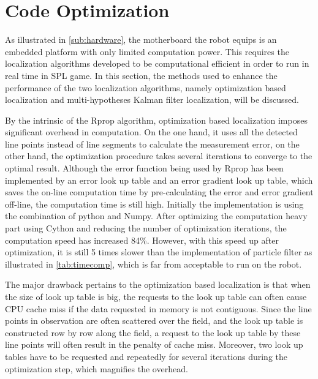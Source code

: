 




\section{Code Optimization}
\label{sec:Optimization}
As illustrated in \autoref{sub:hardware}, the motherboard the robot equips is an embedded platform with only limited computation power. This requires the localization algorithms developed to be computational efficient in order to run in real time in \gls{SPL} game. In this section, the methods used to enhance the performance of the two localization algorithms, namely optimization based localization and multi-hypotheses Kalman filter localization, will be discussed.

By the intrinsic of the Rprop algorithm, optimization based localization imposes significant overhead in computation. On the one hand, it uses all the detected line points instead of line segments to calculate the measurement error, on the other hand, the optimization procedure takes several iterations to converge to the optimal result. Although the error function being used by Rprop has been implemented by an error look up table and an error gradient look up table, which saves the on-line computation time by pre-calculating the error and error gradient off-line, the computation time is still high. Initially the implementation is using the combination of python and Numpy. After optimizing the computation heavy part using Cython and reducing the number of optimization iterations, the computation speed has increased 84\%. However, with this speed up after optimization, it is still 5 times slower than the implementation of particle filter as illustrated in \autoref{tab:timecomp}, which is far from acceptable to run on the robot.

The major drawback pertains to the optimization based localization is that when the size of look up table is big, the requests to the look up table can often cause CPU cache miss if the data requested in memory is not contiguous. Since the line points in observation are often scattered over the field, and the look up table is constructed row by row along the field, a request to the look up table by these line points will often result in the penalty of cache miss. Moreover, two look up tables have to be requested and repeatedly for several iterations during the optimization step, which magnifies the overhead.

